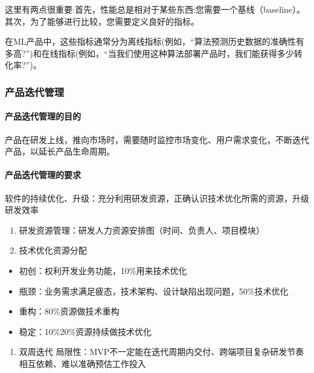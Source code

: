 \documentclass[letterpaper,10pt,english]{sphinxmanual}
\begin{document}
这里有两点很重要:首先，性能总是相对于某些东西:您需要一个基线（baseline）。其次，为了能够进行比较，您需要定义良好的指标。

在ML产品中，这些指标通常分为离线指标(例如，“算法预测历史数据的准确性有多高?”)和在线指标(例如，“当我们使用这种算法部署产品时，我们能获得多少转化率?”)。


\subsubsection{产品迭代管理}
\label{\detokenize{chapter_knowledge/upgrade_manage:id1}}\label{\detokenize{chapter_knowledge/upgrade_manage::doc}}

\paragraph{产品迭代管理的目的}
\label{\detokenize{chapter_knowledge/upgrade_manage:id2}}
产品在研发上线，推向市场时，需要随时监控市场变化、用户需求变化，不断迭代产品，以延长产品生命周期。


\paragraph{产品迭代管理的要求}
\label{\detokenize{chapter_knowledge/upgrade_manage:id3}}
软件的持续优化、升级：充分利用研发资源，正确认识技术优化所需的资源，升级研发效率
\begin{enumerate}
%
\item {} 
研发资源管理：研发人力资源安排图（时间、负责人、项目模块）

\item {} 
技术优化资源分配

\end{enumerate}
\begin{itemize}
\item {} 
初创：权利开发业务功能，10\%用来技术优化

\item {} 
瓶颈：业务需求满足疲态，技术架构、设计缺陷出现问题，50\%技术优化

\item {} 
重构：80\%资源做技术重构

\item {} 
稳定：10\%\sphinxhyphen{}20\%资源持续做技术优化

\end{itemize}
\begin{enumerate}
%
\item {} 
双周迭代
局限性：MVP不一定能在迭代周期内交付、跨端项目复杂研发节奏相互依赖、难以准确预估工作投入

\end{enumerate}
\end{document}
